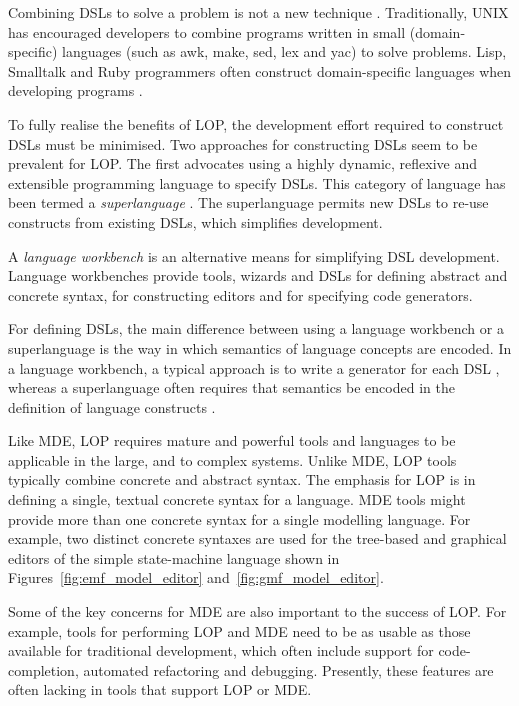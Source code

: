 Combining \cc DSLs to solve a problem is not a new technique \cite{fowler10dsls}. Traditionally, UNIX has encouraged developers to combine programs written in small (domain-specific) languages (such as awk, make, sed, lex and yac) to solve problems. Lisp, Smalltalk and Ruby programmers often construct domain-specific languages when developing programs \cite{graham93lisp}.

To fully realise the benefits of LOP, the development effort required to construct DSLs must be minimised. Two approaches for constructing DSLs seem to be prevalent for LOP. The first advocates using a highly dynamic, reflexive and extensible programming language to specify DSLs. This category of language has been termed a \emph{superlanguage} \cite{clark08superlanguages}. The superlanguage permits new DSLs to re-use constructs from existing DSLs, which simplifies development.

A \textit{language workbench} \cite[ch. 9]{fowler10dsls} is an alternative means for simplifying DSL development. Language workbenches provide tools, wizards and DSLs for defining abstract and concrete syntax, for constructing editors and for specifying code generators.

For defining DSLs, the main difference between using a language workbench or a superlanguage is the way in which semantics of language concepts are encoded. In a language workbench, a typical approach is to write a generator for each DSL \cite{fowler10dsls}, whereas a superlanguage often requires that semantics be encoded in the definition of language constructs \cite{clark08superlanguages}.

Like MDE, LOP requires mature and powerful tools and languages to be applicable in the large, and to complex systems. Unlike MDE, LOP tools typically combine concrete and abstract syntax. The emphasis for LOP is in defining a single, textual concrete syntax for a language. MDE tools might provide more than one concrete syntax for a single modelling language. For example, two distinct concrete syntaxes are used for the tree-based and graphical editors of the simple state-machine language shown in Figures~\ref{fig:emf_model_editor} and~\ref{fig:gmf_model_editor}.

Some of the key concerns for MDE are also important to the success of LOP. For example, tools for performing LOP and MDE need to be as usable as those available for traditional development, which often include support for code-completion, automated refactoring and debugging. Presently, these features are often lacking in tools that support LOP or MDE.


